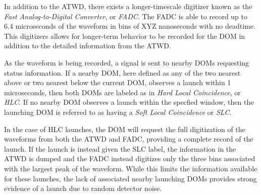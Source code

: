 In addition to the ATWD, there exists a longer-timescale digitizer known as the \emph{Fast Analog-to-Digital Converter}, or \emph{FADC}. 
The FADC is able to record up to 6.4 microseconds of the waveform in bins of XYZ nanoseconds with no deadtime.
This digitizers allows for longer-term behavior to be recorded for the DOM in addition to the detailed information from the ATWD.

As the waveform is being recorded, a signal is sent to nearby DOMs requesting status information.
If a nearby DOM, here defined as any of the two nearest above or two nearest below the current DOM, observes a launch within 1 microseconds, then both DOMs are labeled as in \emph{Hard Local Coincidence}, or \emph{HLC}.
If no nearby DOM observes a launch within the specfied window, then the launching DOM is referred to as having a \emph{Soft Local Coincidence} or \emph{SLC}.

In the case of HLC launches, the DOM will request the full digitization of the waveforms from both the ATWD and FADC, providing a complete record of the launch.
If the launch is instead given the SLC label, the information in the ATWD is dumped and the FADC instead digitizes only the three bins associated with the largest peak of the waveform.
While this limits the information available for these launches, the lack of associated nearby launching DOMs provides strong evidence of a launch due to random detector noise.
